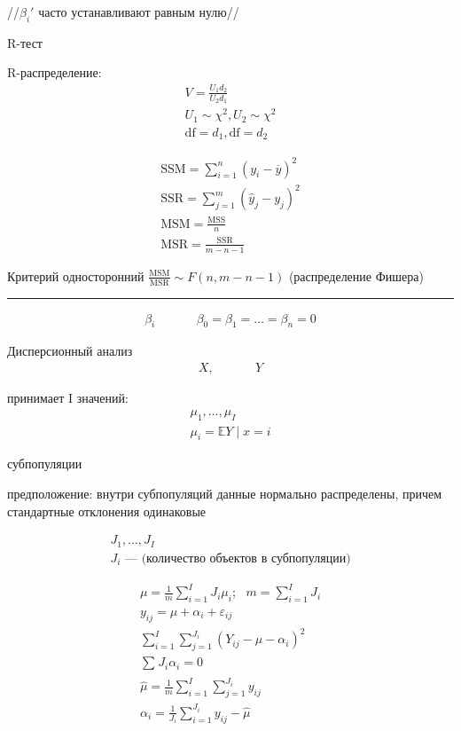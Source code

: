 \documentclass{book}
\begin{document}
//$\beta_i'$ часто устанавливают равным нулю//

R-тест

R-распределение:
\begin{gather*}
  V=\frac{U_1d_2}{U_2d_1}\\
  U_1 \sim \chi^2, U_2 \sim \chi^2\\
  \mathrm{df}=d_1, \mathrm{df}=d_2
\end{gather*}

\begin{gather*}
  \mathrm{SSM}=\sum_{i=1}^{n} {(y_i-\overline{y})}^2\\
  \mathrm{SSR}=\sum_{j=1}^{m} {(\hat{y}_j-y_j)^2}\\
  \mathrm{MSM}=\frac{\mathrm{MSS}}{n}\\
  \mathrm{MSR}=\frac{\mathrm{SSR}}{m-n-1}
\end{gather*}

Критерий односторонний $\frac{\mathrm{MSM}}{\mathrm{MSR}}\sim F(n, m-n-1)$
(распределение Фишера)


\hrule

\begin{gather*}
  \beta_i~~~~~~~~~~~~~~~\beta_0=\beta_1=\dots=\beta_n=0
\end{gather*}

Дисперсионный анализ
\begin{gather*}
  X,~~~~~~~~~~~~~~~Y
\end{gather*}

принимает I значений:
\begin{gather*}
  \mu_1,\dots,\mu_I\\
  \mu_i=\mathbb{E}Y\mid x=i
\end{gather*}

субпопуляции

предположение: внутри субпопуляций данные нормально распределены, причем стандартные отклонения одинаковые

\begin{gather*}
  J_1,\dots,J_I\\
  J_i\textrm{ --- (количество объектов в субпопуляции)}
\end{gather*}

\begin{gather*}
  \mu = \frac{1}{m}\sum_{i=1}^{I} {J_i\mu_i;~~~m=\sum_{i=1}^{I} {J_i}}\\
  y_{ij}=\mu+\alpha_i+\varepsilon_{ij}\\
  \sum_{i=1}^{I} \sum_{j=1}^{J_i} {(Y_{ij}-\mu-\alpha_i)^2}\\
  \sum_{}^{} {J_i\alpha_i}=0\\
  \hat{\mu}=\frac{1}{m}\sum_{i=1}^{I} {\sum_{j=1}^{J_i} {y_{ij}}}\\
  \alpha_i=\frac{1}{J_i}\sum_{i=1}^{J_i} {y_{ij}-\hat{\mu}}
\end{gather*}
\end{document}
